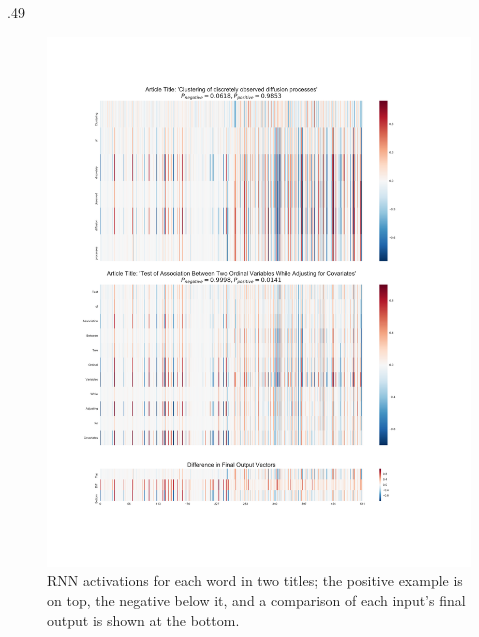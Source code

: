 \documentclass[final]{beamer}
\newlength{\onecolwid}
\begin{document}
\begin{frame}{}
\begin{columns}[t]
\begin{column}{\onecolwid}
\begin{columns}[t,totalwidth=\onecolwid]
\begin{column}{.49\onecolwid}
\begin{block}
			\begin{figure}
				\centering
				\begin{adjustbox}{center}
				\includegraphics[width=0.55\onecolwid]{comparisonTitle.pdf}
				\end{adjustbox}
				\caption[skip=20pt]{RNN activations for each word in two titles; the positive example is on top, the negative below it, and a comparison of each input's final output is shown at the bottom.}\label{title}
				
			\end{figure}
			
		\end{block}
		
	\end{column} %
	

\end{columns}
\end{column}
\end{columns}
\end{frame}
\end{document}
